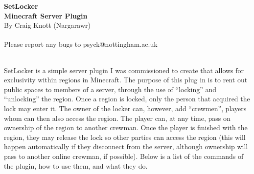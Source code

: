 \documentclass[a4paper,twoside,notitlepage,11pt]{article}
\newcommand{\nin}{\noindent}
\begin{document}
\begin{center}
   \textbf{SetLocker\ \\Minecraft Server Plugin} \ \\
   By Craig Knott (Nargarawr) \ \\
   \ \\
   Please report any bugs to psyck@nottingham.ac.uk
\end{center}
\ \\
\nin
SetLocker is a simple server plugin I was commissioned to create that allows for exclusivity within regions in Minecraft. The purpose of this plug in is to rent out public spaces to members of a server, through the use of ``locking'' and ``unlocking'' the region. Once a region is locked, only the person that acquired the lock may enter it. The owner of the locker can, however, add ``crewmen'', players whom can then also access the region. The player can, at any time, pass on ownership of the region to another crewman. Once the player is finished with the region, they may release the lock so other parties can access the region (this will happen automatically if they disconnect from the server, although ownership will pass to another online crewman, if possible). Below is a list of the commands of the plugin, how to use them, and what they do.
\end{document}

